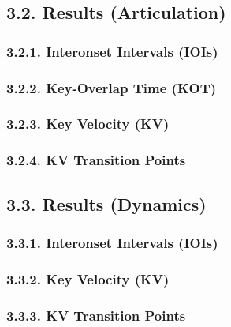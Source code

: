 \documentclass[
  english,
  man,floatsintext]{apa6}
\begin{document}
\hypertarget{results-articulation-1}{%
\subsection{3.2. Results (Articulation)}\label{results-articulation-1}}

\hypertarget{interonset-intervals-iois-2}{%
\subsubsection{3.2.1. Interonset Intervals (IOIs)}\label{interonset-intervals-iois-2}}

\hypertarget{key-overlap-time-kot-2}{%
\subsubsection{3.2.2. Key-Overlap Time (KOT)}\label{key-overlap-time-kot-2}}

\hypertarget{key-velocity-kv-2}{%
\subsubsection{3.2.3. Key Velocity (KV)}\label{key-velocity-kv-2}}

\hypertarget{kv-transition-points-2}{%
\subsubsection{3.2.4. KV Transition Points}\label{kv-transition-points-2}}

\hypertarget{results-dynamics-1}{%
\subsection{3.3. Results (Dynamics)}\label{results-dynamics-1}}

\hypertarget{interonset-intervals-iois-3}{%
\subsubsection{3.3.1. Interonset Intervals (IOIs)}\label{interonset-intervals-iois-3}}

\hypertarget{key-velocity-kv-3}{%
\subsubsection{3.3.2. Key Velocity (KV)}\label{key-velocity-kv-3}}

\hypertarget{kv-transition-points-3}{%
\subsubsection{3.3.3. KV Transition Points}\label{kv-transition-points-3}}
\end{document}
